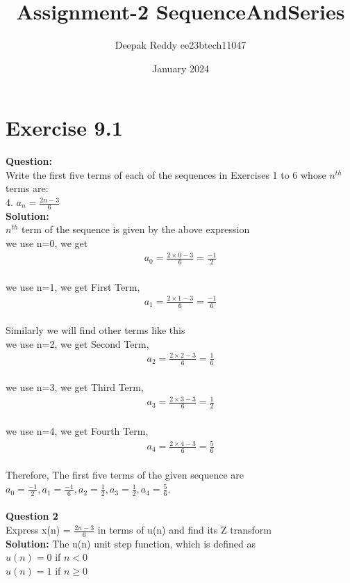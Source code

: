 \documentclass[journal,12pt,twocolumn]{IEEEtran}
\title{Assignment-2 SequenceAndSeries}
\author{Deepak Reddy ee23btech11047}
\date{January 2024}
\theoremstyle{remark}
\begin{document}
\maketitle
\section*{Exercise 9.1}
\textbf{Question:}\\
Write the first five terms of each of the sequences in Exercises 1 to 6 whose $n^{th}$
terms are:\\
4. $a_n = \frac{2n-3}{6}$\\
\textbf{Solution:}\\
$n^{th}$ term of the sequence is given by the above expression\\
we use n=0, we get
\begin{align}a_{0} = \frac{2 \times 0 - 3}{6} = \frac{-1}{2} \end{align}\\
we use n=1, we get First Term,
\begin{align}a_1 = \frac{2 \times 1 - 3}{6} = \frac{-1}{6} \end{align}\\
Similarly we will find other terms like this\\
we use n=2, we get Second Term,
\begin{align} a_{2} = \frac{2 \times 2 - 3}{6} = \frac{1}{6}  \end{align}\\
we use n=3, we get Third Term,
\begin{align} a_{3} = \frac{2 \times 3 - 3}{6} = \frac{1}{2} \end{align}\\
we use n=4, we get Fourth Term,
\begin{align} a_{4} = \frac{2 \times 4 - 3}{6} = \frac{5}{6} \end{align}\\
Therefore, The first five terms of the given sequence are
$a_0 = \frac{-1}{2}, a_1 = \frac{-1}{6},a_2 = \frac{1}{2}, a_3= \frac{1}{2} , a_4 = \frac{5}{6} .$\\
\\
\textbf{Question 2}\\
Express x(n) = $\frac{2n-3}{6}$ in terms of u(n) and find its Z transform\\
\textbf{Solution:}
The u(n) unit step function, which is defined as\\
$u(n) = 0$ if $ n < 0 $\\ 
$u(n)=1 $ if $n \ge 0 $\\
\end{document}
